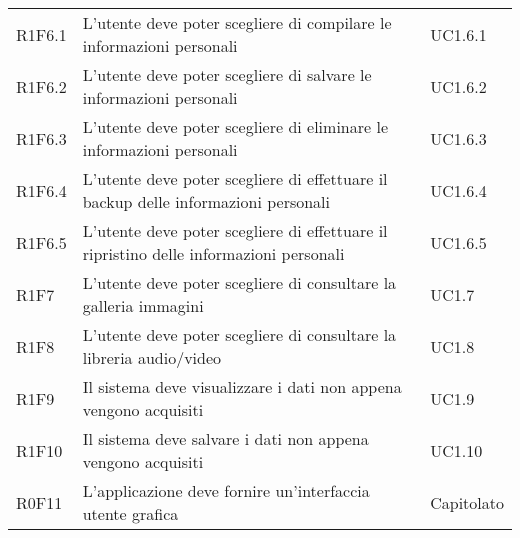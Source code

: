 \begin{longtable}{lp{}l}
R1F6.1
& L'utente deve poter scegliere di compilare le informazioni personali
& UC1.6.1 \\
R1F6.2
& L'utente deve poter scegliere di salvare le informazioni personali
& UC1.6.2 \\
R1F6.3
& L'utente deve poter scegliere di eliminare le informazioni personali
& UC1.6.3 \\
R1F6.4
& L'utente deve poter scegliere di effettuare il backup delle informazioni personali
& UC1.6.4 \\
R1F6.5
& L'utente deve poter scegliere di effettuare il ripristino delle informazioni personali
& UC1.6.5 \\
R1F7
& L'utente deve poter scegliere di consultare la galleria immagini
& UC1.7 \\
R1F8
& L'utente deve poter scegliere di consultare la libreria audio/video
& UC1.8 \\
R1F9
& Il sistema deve visualizzare i dati non appena vengono acquisiti
& UC1.9 \\
R1F10
& Il sistema deve salvare i dati non appena vengono acquisiti
& UC1.10 \\
R0F11
& L'applicazione deve fornire un'interfaccia utente grafica
& Capitolato \\
\end{longtable}